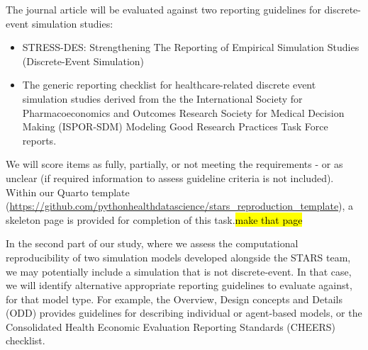 The journal article will be evaluated against two reporting guidelines for discrete-event simulation studies:
\begin{itemize}
    \item STRESS-DES: Strengthening The Reporting of Empirical Simulation Studies (Discrete-Event Simulation)\autocite{monks_strengthening_2019}
    \item The generic reporting checklist for healthcare-related discrete event simulation studies derived from the the International Society for Pharmacoeconomics and Outcomes Research Society for Medical Decision Making (ISPOR-SDM) Modeling Good Research Practices Task Force reports.\autocite{zhang_reporting_2020}
\end{itemize}

We will score items as fully, partially, or not meeting the requirements - or as unclear (if required information to assess guideline criteria is not included). Within our Quarto template (\url{https://github.com/pythonhealthdatascience/stars_reproduction_template}), a skeleton page is provided for completion of this task.\hl{make that page}

In the second part of our study, where we assess the computational reproducibility of two simulation models developed alongside the STARS team, we may potentially include a simulation that is not discrete-event. In that case, we will identify alternative appropriate reporting guidelines to evaluate against, for that model type. For example, the Overview, Design concepts and Details (ODD) provides guidelines for describing individual or agent-based models,\autocite{grimm_odd_2020} or the Consolidated Health Economic Evaluation Reporting Standards (CHEERS) checklist.\autocite{husereau_consolidated_2013, husereau_consolidated_2013-1}